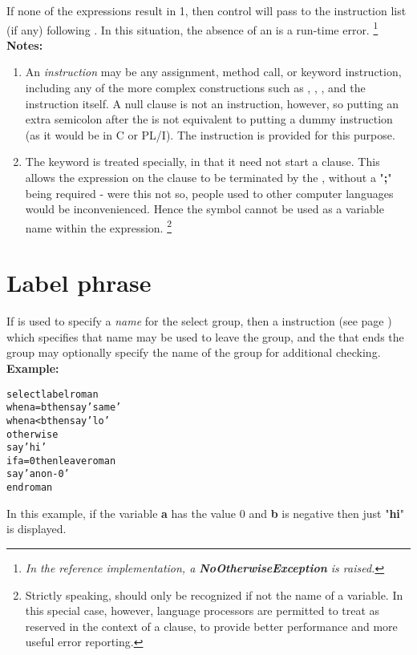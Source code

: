 If none of the  expressions result in 1, then control will
pass to the instruction list (if any) following .
In this situation, the absence of an  is a run-time
error.
\footnote{
\emph{In the reference implementation, a \textbf{NoOtherwiseException}
is raised.}
}
 \textbf{Notes:}
\begin{enumerate}
\item An \emph{instruction} may be any assignment, method call, or keyword
instruction, including any of the more complex constructions such as
, , , and the 
instruction itself.
A null clause is not an instruction, however, so putting an extra
semicolon after the  is not equivalent to putting a dummy
instruction (as it would be in C or PL/I).
The  instruction is provided for this purpose.
\item The keyword  is treated specially, in that it need not
start a clause.
This allows the expression on the  clause to be terminated
by the , without a "\textbf{;}" being required
- were this not so, people used to other computer languages would
be inconvenienced.
Hence the symbol  cannot be used as a variable name within
the expression.
\footnote{
Strictly speaking,  should only be recognized if not
the name of a variable.  In this special case, however, \nr{} language
processors are permitted to treat  as reserved in the
context of a  clause, to provide better performance and
more useful error reporting.
}
\end{enumerate}
\section{Label phrase}
 
If  is used to specify a \emph{name} for the select
group, then a   instruction (see page \pageref{refleave})  which
specifies that name may be used to leave the group, and the 
that ends the group may optionally specify the name of the group for
additional checking.
 \textbf{Example:}
\begin{alltt}
select label roman
  when a=b then say 'same'
  when a<b then say 'lo'
  otherwise
    say 'hi'
    if a=0 then leave roman
    say 'a non-0'
  end roman
\end{alltt}
In this example, if the variable \textbf{a} has the value 0
and \textbf{b} is negative then just "\textbf{hi}" is
displayed.
